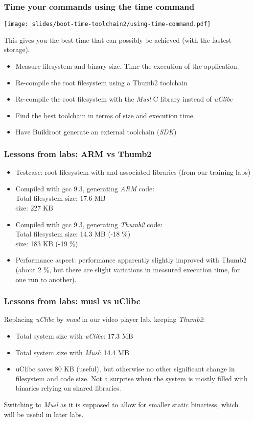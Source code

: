 \begin{frame}
\frametitle{Time your commands using the time command}
\begin{center}
\texttt{[image: slides/boot-time-toolchain2/using-time-command.pdf]}
\end{center}
This gives you the best time that can possibly be achieved (with the fastest storage).
\end{frame}

{
\begin{itemize}
\item Measure filesystem and  binary size. Time
      the execution of the application.
\item Re-compile the root filesystem using a Thumb2 toolchain
\item Re-compile the root filesystem with the {\em Musl}
      C library instead of {\em uClibc}
\item Find the best toolchain in terms of size and execution time.
\item Have Buildroot generate an external toolchain ({\em SDK})
\end{itemize}
}


\begin{frame}
\frametitle{Lessons from labs: ARM vs Thumb2}
\begin{itemize}
\item Testcase: root filesystem with  and associated
      libraries (from our training labs)
\item Compiled with gcc 9.3, generating {\em ARM} code:\\
      Total filesystem size: 17.6 MB\\
       size: 227 KB
\item Compiled with gcc 9.3, generating {\em Thumb2} code:\\
      Total filesystem size: 14.3 MB (-18 \%)\\
       size: 183 KB (-19 \%)
\item Performance aspect: performance apparently slightly improved with Thumb2
      (about 2 \%, but there are slight variations in measured
      execution time, for one run to another).
\end{itemize}
\end{frame}

\begin{frame}
\frametitle{Lessons from labs: musl vs uClibc}
Replacing {\em uClibc} by {\em musl} in our video player lab, keeping
{\em Thumb2}:
\begin{itemize}
   \item Total system size with {\em uClibc}: 17.3 MB
   \item Total system size with {\em Musl}: 14.4 MB
   \item uClibc saves 80 KB (useful), but otherwise no other significant change
    in filesystem and code size. Not a surprise when the system is mostly filled
    with binaries relying on shared libraries.
\end{itemize}
Switching to {\em Musl} as it is supposed to allow for smaller static
binariess, which will be useful in later labs.
\end{frame}

